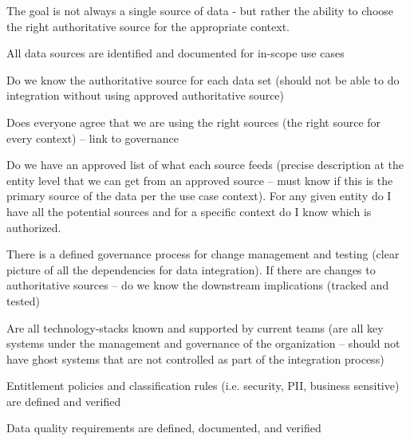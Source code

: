 \kgmmcorequestionssection

The goal is not always a single source of data - but rather the ability to choose the right authoritative source
for the appropriate context.

\kgmmscoringsection

\kgmmscoringlevelOne

\begin{scoring}

    \item All data sources are identified and documented for in-scope use cases
    \item Do we know the authoritative source for each data set (should not be able to do integration without
          using approved authoritative source)
    \item Does everyone agree that we are using the right sources (the right source for every context) --
          link to governance
    \item Do we have an approved list of what each source feeds (precise description at the entity level that
          we can get from an approved source -- must know if this is the primary source of the data per the
          use case context).
          For any given entity do I have all the potential sources and for a specific context do I know which
          is authorized.
    \item There is a defined governance process for change management and testing (clear picture of all the
          dependencies for data integration).
          If there are changes to authoritative sources -- do we know the downstream implications (tracked and tested)
    \item Are all \glspl{technology-stack} known and supported by current teams (are all key systems under the
          management and governance of the organization -- should not have ghost systems that are not controlled
          as part of the integration process)
    \item Entitlement policies and classification rules (i.e. security, PII, business sensitive) are
          defined and verified
    \item Data quality requirements are defined, documented, and verified

\end{scoring}

\kgmmscoringlevelTwo

